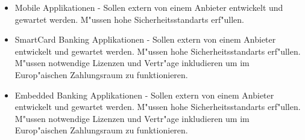 \begin{itemize}
	\item Mobile Applikationen - Sollen extern von einem Anbieter entwickelt und gewartet werden. M"ussen hohe Sicherheitsstandarts erf"ullen.

	\item SmartCard Banking Applikationen - Sollen extern von einem Anbieter entwickelt und gewartet werden. M"ussen hohe Sicherheitsstandarts erf"ullen. M"ussen notwendige Lizenzen und Vertr"age inkludieren um im Europ"aischen Zahlungsraum zu funktionieren.	
	
	\item Embedded Banking Applikationen - Sollen extern von einem Anbieter entwickelt und gewartet werden. M"ussen hohe Sicherheitsstandarts erf"ullen. M"ussen notwendige Lizenzen und Vertr"age inkludieren um im Europ"aischen Zahlungsraum zu funktionieren.	
	
\end{itemize}
